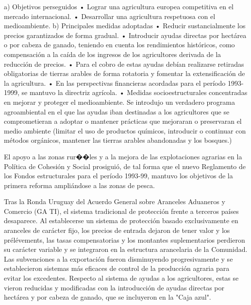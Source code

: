 \documentclass[10pt,a4paper]{article}
\begin{document}
a) Objetivos perseguidos
• Lograr una agricultura europea competitiva en el mercado internacional.
• Desarrollar una agricultura respetuosa con el medioambiente.
b) Principales medidas adoptadas
• Reducir sustancialmente los precios garantizados de forma gradual.
• Introducir ayudas directas por hectárea o por cabeza de ganado, teniendo en cuenta los rendimientos históricos, como compensación a la caída de los ingresos de los agricultores derivada de la reducción de precios.
• Para el cobro de estas ayudas debían realizarse retiradas obligatorias de tierras arables de forma rotatoria y fomentar la extensificación de la agricultura.
• En las perspectivas financieras acordadas para el período 1993- 1999, se mantuvo la directriz agrícola.
• Medidas socioestructurales concentradas en mejorar y proteger el medioambiente. Se introdujo un verdadero programa agroambiental en el que las ayudas iban destinadas a los agricultores que se comprometieran a adoptar o mantener prácticas que mejoraran o preservaran el medio ambiente (limitar el uso de productos químicos, introducir o continuar con métodos orgánicos, mantener las tierras arables abandonadas y los bosques.)

El apoyo a las zonas rur��les y a la mejora de las explotaciones agrarias en la Política de Cohesión y Social prosiguió, de tal forma que el nuevo Reglamento de los Fondos estructurales para el período 1993-99, mantuvo los objetivos de la primera reforma ampliándose a las zonas de pesca.

Tras la Ronda Uruguay del Acuerdo General sobre Aranceles Aduaneros y Comercio (GA TI), el sistema tradicional de protección frente a terceros países desaparece. Al establecerse un sistema de protección basado exclusivamente en aranceles de carácter fijo, los precios de entrada dejaron de tener valor y los prélévements, las tasas compensatorias y los montantes suplementarios perdieron su carácter variable y se integraron en la estructura arancelaria de la Comunidad. Las subvenciones a la exportación fueron disminuyendo progresivamente y se establecieron sistemas más eficaces de control de la producción agraria para evitar los excedentes. Respecto al sistema de ayudas a los agricultores, estas se vieron reducidas y modificadas con la introducción de ayudas directas por hectárea y por cabeza de ganado, que se incluyeron en la "Caja azul". 
\end{document}
